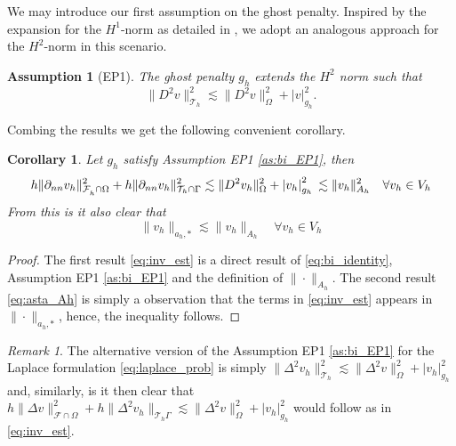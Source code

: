 \documentclass[11pt]{article}
\newtheorem*{assumption*}{Assumption} %
\newtheorem{corollary}[theorem]{Corollary}
\theoremstyle{remark}
\newtheorem*{remark}{Remark}
\newcommand{\abs}[1]{\left\lvert #1 \right\rvert}
\numberwithin{equation}{section}
\begin{document}
We may introduce our first assumption on the ghost penalty.  Inspired by the expansion for the $H^{1}$-norm as detailed in \cite[Equation 2.23]{gurkan2019stabilized}, we adopt an analogous approach for the $H^{2}$-norm in this scenario.
\begin{assumption*}[EP1]
    The ghost penalty $g_{h}$ extends the $H^{2}$ norm such that
    \begin{equation}
    \label{as:bi_EP1}
    \| D^2 v \|_{ \mathcal{T} _{h} }^{ 2 } \lesssim  \| D^2 v \|_{ \Omega  }^{ 2 } + \abs{ v } _{g_{h}}^{2}.
    \end{equation}
\end{assumption*}


Combing the results we get the following convenient corollary.

\begin{corollary}
    \label{cor:bi_inverse_thm}
    Let  $g_{h}$ satisfy Assumption EP1 \eqref{as:bi_EP1}, then
    \begin{equation}
        \label{eq:inv_est}
            h\| \partial _{nn}  v_{h} \|_{ \mathcal{F}_h^{} \cap \Omega    }^{2 } + h\| \partial _{nn} v_{h} \|_{ \mathcal{T} _{h} \cap \Gamma  }^{2  }   \lesssim  \| D^2 v_{h} \|_{ \Omega  }^{ 2 } + \abs{ v_{h} } _{g_{h}}^{2} \\
              \lesssim \| v_{h} \|_{ A_{h} }^{  2} \quad  \forall v_{h} \in V_{h}
    \end{equation}
    From this is it also clear that \begin{equation}
        \label{eq:asta_Ah}
    \| v_{h} \|_{ a_{h},* }^{  }  \lesssim \| v_{h} \|_{ A_{h} }^{  } \quad  \forall v_{h} \in V_{h}
    \end{equation}
\end{corollary}
\begin{proof}
    The first result \eqref{eq:inv_est} is a direct result of \eqref{eq:bi_identity}, Assumption EP1 \eqref{as:bi_EP1} and the definition of $\| \cdot  \|_{ A_{h} }^{  } $.
    The second result \eqref{eq:asta_Ah} is simply a observation that the terms in \eqref{eq:inv_est} appears in $\| \cdot   \|_{a_{h},*  }^{  } $, hence, the inequality follows.
\end{proof}

\begin{remark}
    The alternative version of the Assumption EP1 \eqref{as:bi_EP1} for the Laplace formulation \eqref{eq:laplace_prob} is simply $\| \Delta ^2 v_{h} \|_{ \mathcal{T} _{h} }^{ 2 } \lesssim  \| \Delta ^2 v \|_{\Omega   }^{2  } + \abs{ v_{h} } _{g_{h}} ^{2}
    $ and, similarly, is it then clear that $ h \| \Delta v  \|_{\mathcal{F} \cap \Omega   }^{ 2 } +h \| \Delta^2 v_{h}  \|_{\mathcal{T} _{h} \Gamma   }^{  } \lesssim  \| \Delta ^2 v \|_{\Omega   }^{2  } + \abs{ v_{h} } _{g_{h}} ^{2} $ would follow  as in
    \eqref{eq:inv_est}.

\end{remark}
\end{document}
